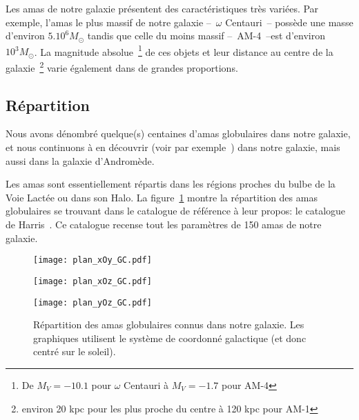 			Les amas de notre galaxie présentent des caractéristiques très variées. Par
			exemple, l'amas le plus massif de notre galaxie --~$\omega$ Centauri~--
			possède une masse d'environ $5.10^6 M_\odot$ tandis que celle du moins
			massif --~AM-4~--est d'environ $10^3 M_\odot$. La magnitude
			absolue~\footnote{De $M_V = -10.1$ pour $\omega$ Centauri à $M_V = -1.7$
			pour AM-4} de ces objets et leur distance au centre de la
			galaxie~\footnote{environ 20 kpc pour les plus proche du centre à 120 kpc
			pour AM-1} varie également dans de grandes proportions.

		\subsection{Répartition}

			Nous avons dénombré quelque(s) centaines d'amas globulaires dans
			notre galaxie, et nous continuons à en découvrir (voir par
			exemple~\cite{2014ApJ...786L...3L}) dans notre galaxie, mais aussi dans la galaxie d'Andromède.

			Les amas sont essentiellement répartis dans les régions proches du
			bulbe de la Voie Lactée ou dans son Halo.
			La figure~\ref{Fig::Intro::repartition} montre la répartition des amas
			globulaires se trouvant dans le catalogue de référence à leur propos: le
			catalogue de Harris~\cite{Harris}. Ce catalogue recense tout les paramètres
			de 150 amas de notre galaxie.

			\begin{figure}[h]
				\begin{minipage}{0.32\textwidth}
					\begin{center}
						\texttt{[image: plan\_xOy\_GC.pdf]}
					\end{center}
				\end{minipage}\hfill
				\begin{minipage}{0.32\textwidth}
					\begin{center}
						\texttt{[image: plan\_xOz\_GC.pdf]}
					\end{center}
				\end{minipage}\hfill
				\begin{minipage}{0.32\textwidth}
					\begin{center}
						\texttt{[image: plan\_yOz\_GC.pdf]}
					\end{center}
				\end{minipage}
				\caption{\label{Fig::Intro::repartition}Répartition des amas globulaires connus dans notre galaxie. Les graphiques utilisent le système de coordonné galactique (et donc centré sur le soleil).}
			\end{figure}


